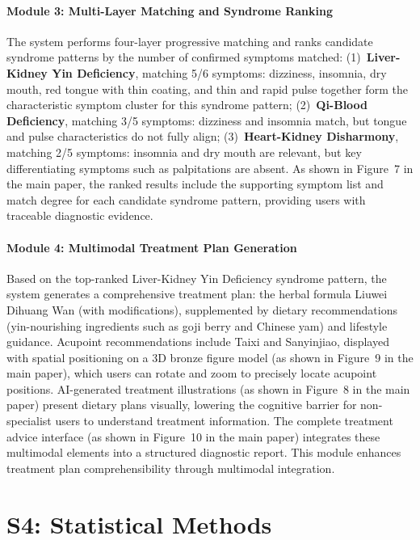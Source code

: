 \documentclass[12pt]{article}
\begin{document}
\paragraph{Module 3: Multi-Layer Matching and Syndrome Ranking}
The system performs four-layer progressive matching and ranks candidate syndrome patterns by the number of confirmed symptoms matched:
(1)~\textbf{Liver-Kidney Yin Deficiency}, matching 5/6 symptoms: dizziness, insomnia, dry mouth, red tongue with thin coating, and thin and rapid pulse together form the characteristic symptom cluster for this syndrome pattern;
(2)~\textbf{Qi-Blood Deficiency}, matching 3/5 symptoms: dizziness and insomnia match, but tongue and pulse characteristics do not fully align;
(3)~\textbf{Heart-Kidney Disharmony}, matching 2/5 symptoms: insomnia and dry mouth are relevant, but key differentiating symptoms such as palpitations are absent.
As shown in Figure~7 in the main paper, the ranked results include the supporting symptom list and match degree for each candidate syndrome pattern,
providing users with traceable diagnostic evidence.

\paragraph{Module 4: Multimodal Treatment Plan Generation}
Based on the top-ranked Liver-Kidney Yin Deficiency syndrome pattern, the system generates a comprehensive treatment plan:
the herbal formula Liuwei Dihuang Wan (with modifications), supplemented by dietary recommendations (yin-nourishing ingredients such as goji berry and Chinese yam) and lifestyle guidance.
Acupoint recommendations include Taixi and Sanyinjiao, displayed with spatial positioning on a 3D bronze figure model (as shown in Figure~9 in the main paper),
which users can rotate and zoom to precisely locate acupoint positions.
AI-generated treatment illustrations (as shown in Figure~8 in the main paper) present dietary plans visually,
lowering the cognitive barrier for non-specialist users to understand treatment information.
The complete treatment advice interface (as shown in Figure~10 in the main paper) integrates these multimodal elements into a structured diagnostic report.
This module enhances treatment plan comprehensibility through multimodal integration.

\section{S4: Statistical Methods}
\label{sec:si-statistics}
\end{document}
